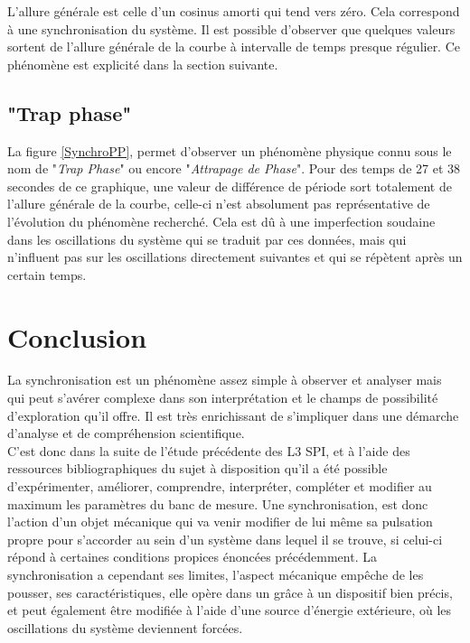 \documentclass[a4paper,11pt]{report}
\begin{document}
L'allure générale est celle d'un cosinus amorti qui tend vers zéro. Cela correspond à une synchronisation du système. Il est possible d'observer que quelques valeurs sortent de l'allure générale de la courbe à intervalle de temps presque régulier. Ce phénomène est explicité dans la section suivante.

\section{"Trap phase"}
La figure \ref{SynchroPP}, permet d'observer un phénomène physique connu sous le nom de "{\it Trap Phase}" ou encore "{\it Attrapage de Phase}". Pour des temps de 27 et 38 secondes de ce graphique, une valeur de différence de période sort totalement de l'allure générale de la courbe, celle-ci n'est absolument pas représentative de l'évolution du phénomène recherché. Cela est dû à une imperfection soudaine dans les oscillations du système qui se traduit par ces données, mais qui n'influent pas sur les oscillations directement suivantes et qui se répètent après un certain temps.
\newpage
\null
\thispagestyle{empty}

\chapter*{Conclusion}
La synchronisation est un phénomène assez simple à observer et analyser mais qui peut s'avérer complexe dans son interprétation et le champs de possibilité d'exploration qu'il offre. Il est très enrichissant de s'impliquer dans une démarche d'analyse et de compréhension scientifique.\\

C'est donc dans la suite de l'étude précédente des L3 SPI, et à l'aide des ressources bibliographiques du sujet à disposition qu'il a été possible d'expérimenter, améliorer, comprendre, interpréter, compléter et modifier au maximum les paramètres du banc de mesure. Une synchronisation, est donc l'action d'un objet mécanique qui va venir modifier de lui même sa pulsation propre pour s'accorder au sein d'un système dans lequel il se trouve, si celui-ci répond à certaines conditions propices énoncées précédemment. La synchronisation a cependant ses limites, l'aspect mécanique empêche de les pousser, ses caractéristiques, elle opère dans un grâce à un dispositif bien précis, et peut également être modifiée à l'aide d'une source d'énergie extérieure, où les oscillations du système deviennent forcées.\\
\end{document}
